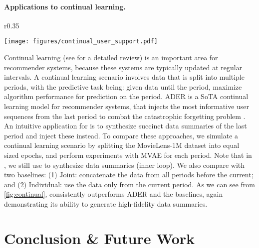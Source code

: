 \documentclass{article}
\begin{document}
\paragraph{Applications to continual learning.} 

\begin{wrapfigure}{r}{0.35\textwidth}
  \vspace{-0.8cm}
  \begin{center}
    \texttt{[image: figures/continual\_user\_support.pdf]}
  \end{center}
  \vspace{-0.2cm}
  \caption{\sampler for continual learning.}
  \label{fig:continual}
  \vspace{-0.3cm}
\end{wrapfigure}

Continual learning (see \cite{continual} for a detailed review) is an important area for recommender systems, because these systems are typically updated at regular intervals. A continual learning scenario involves data that is split into multiple periods, with the predictive task being: given data until the  period, maximize algorithm performance for prediction on the  period. \textsc{ADER} \cite{ader} is a SoTA continual learning model for recommender systems, that injects the most informative user sequences from the last period to combat the catastrophic forgetting problem \cite{catast_forgetting}. 
An intuitive application for \sampler is to synthesize succinct data summaries of the last period and inject these instead. 
To compare these approaches, we simulate a continual learning scenario by splitting the MovieLens-1M dataset into  equal sized epochs, and perform experiments with MVAE \cite{mvae} for each period. Note that in \sampler, we still use \model to synthesize data summaries (inner loop).
We also compare with two baselines: (1) Joint: concatenate the data from all periods before the current; and (2) Individual: use the data only from the current period. As we can see from \cref{fig:continual}, \sampler consistently outperforms \textsc{ADER} and the baselines, again demonstrating its ability to generate high-fidelity data summaries.










\section{Conclusion \& Future Work}
\end{document}
